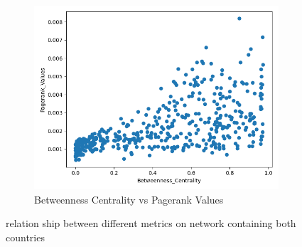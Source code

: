 \begin{figure}[H]
\begin{subfigure}[b]{0.3\textwidth}
         \label{fig:three sin x}
     \end{subfigure}
     \hfill
     \begin{subfigure}[b]{0.3\textwidth}
         \centering
         \includegraphics[width=\textwidth]{images/comparison/ALL/relationship_Betweenness_Centrality_vs_Pagerank_Values_ALL.png}
         \caption{Betweenness Centrality vs Pagerank Values}
         \label{fig:five over x}
     \end{subfigure}
        \caption{relation ship between different metrics on network containing both countries}
        \label{fig:ALL4}
\end{figure}




